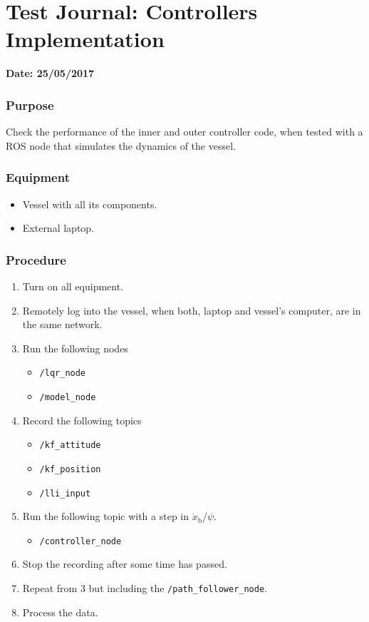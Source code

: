 \chapter{Test Journal: Controllers Implementation} \label{app:ModelNode}

\textbf{Date: 25/05/2017}

\subsection*{Purpose}
Check the performance of the inner and outer controller code, when tested with a ROS node that simulates the dynamics of the vessel.

\subsection*{Equipment}
\begin{itemize}
    \item Vessel with all its components. 
    \item External laptop.
\end{itemize}

\subsection*{Procedure}
\begin{enumerate}
    \item Turn on all equipment.
    \item Remotely log into the vessel, when both, laptop and vessel's computer, are in the same network.
    \item Run the following nodes
    \begin{itemize}
        \item \lstinline[style=cinline]{/lqr_node}  
        \item \lstinline[style=cinline]{/model_node}
    \end{itemize}
    \item Record the following topics
    \begin{itemize}
        \item \lstinline[style=cinline]{/kf_attitude}
        \item \lstinline[style=cinline]{/kf_position}   
        \item \lstinline[style=cinline]{/lli_input}  
    \end{itemize}
    \item Run the following topic with a step in $\dot{x}_\mathrm{b}$/$\psi$.
    \begin{itemize}
        \item \lstinline[style=cinline]{/controller_node}
    \end{itemize}
    \item Stop the recording after some time has passed.
    \item Repeat from 3 but including the \lstinline[style=cinline]{/path_follower_node}.
    \item Process the data.
\end{enumerate}


